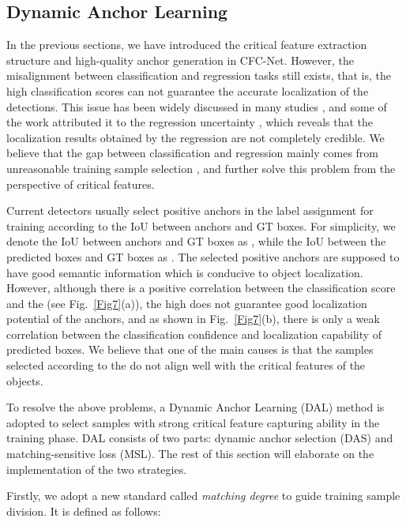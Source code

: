 \documentclass[journal]{IEEEtran}
\begin{document}
\subsection{Dynamic Anchor Learning}
In the previous sections, we have introduced the critical feature extraction structure and high-quality anchor generation in CFC-Net. However, the misalignment between classification and regression tasks still exists, that is, the high classification scores can not guarantee the accurate localization of the detections. This issue has been widely discussed in many studies \cite{he2019bounding, choi2019gaussian, jiang2018acquisition, feng2018towards}, and some of the work attributed it to the regression uncertainty \cite{choi2019gaussian, feng2018towards}, which reveals that the localization results obtained by the regression are not completely credible. We believe that the gap between classification and regression mainly comes from unreasonable training sample selection \cite{ming2020dynamic}, and further solve this problem from the perspective of critical features. 

Current detectors usually select positive anchors in the label assignment for training according to the IoU between anchors and GT boxes. For simplicity, we denote the IoU between anchors and GT boxes as , while the IoU between the predicted boxes and GT boxes as . The selected positive anchors are supposed to have good semantic information which is conducive to object localization. However, although there is a positive correlation between the classification score and the  (see Fig.~\ref{Fig7}(a)), the high  does not guarantee good localization potential of the anchors, and as shown in Fig.~\ref{Fig7}(b), there is only a weak correlation between the classification confidence and localization capability of predicted boxes. We believe that one of the main causes is that the samples selected according to the   do not align well with the critical features of the objects. 

To resolve the above problems, a Dynamic Anchor Learning (DAL) method is adopted to select samples with strong critical feature capturing ability in the training phase. DAL consists of two parts: dynamic anchor selection (DAS) and matching-sensitive loss (MSL). The rest of this section will elaborate on the implementation of the two strategies.

Firstly, we adopt a new standard called \textit{matching degree} to guide training sample division. It is defined as follows:
\end{document}
